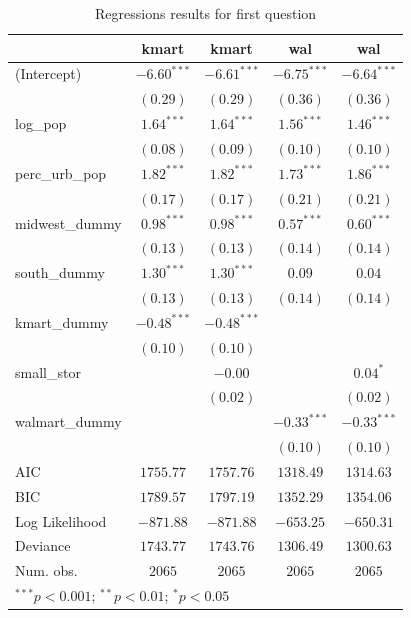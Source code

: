 \documentclass{article}
\theoremstyle{definition}
\begin{document}
\begin{table}[h]
\begin{center}
\begin{tabular}{l c c c c}
\hline
 & kmart & kmart & wal & wal \\
\hline
(Intercept)     & $-6.60^{***}$ & $-6.61^{***}$ & $-6.75^{***}$ & $-6.64^{***}$ \\
                & $(0.29)$      & $(0.29)$      & $(0.36)$      & $(0.36)$      \\
log\_pop        & $1.64^{***}$  & $1.64^{***}$  & $1.56^{***}$  & $1.46^{***}$  \\
                & $(0.08)$      & $(0.09)$      & $(0.10)$      & $(0.10)$      \\
perc\_urb\_pop  & $1.82^{***}$  & $1.82^{***}$  & $1.73^{***}$  & $1.86^{***}$  \\
                & $(0.17)$      & $(0.17)$      & $(0.21)$      & $(0.21)$      \\
midwest\_dummy  & $0.98^{***}$  & $0.98^{***}$  & $0.57^{***}$  & $0.60^{***}$  \\
                & $(0.13)$      & $(0.13)$      & $(0.14)$      & $(0.14)$      \\
south\_dummy    & $1.30^{***}$  & $1.30^{***}$  & $0.09$        & $0.04$        \\
                & $(0.13)$      & $(0.13)$      & $(0.14)$      & $(0.14)$      \\
kmart\_dummy    & $-0.48^{***}$ & $-0.48^{***}$ &               &               \\
                & $(0.10)$      & $(0.10)$      &               &               \\
small\_stor     &               & $-0.00$       &               & $0.04^{*}$    \\
                &               & $(0.02)$      &               & $(0.02)$      \\
walmart\_dummy &               &               & $-0.33^{***}$ & $-0.33^{***}$ \\
                &               &               & $(0.10)$      & $(0.10)$      \\
\hline
AIC             & $1755.77$     & $1757.76$     & $1318.49$     & $1314.63$     \\
BIC             & $1789.57$     & $1797.19$     & $1352.29$     & $1354.06$     \\
Log Likelihood  & $-871.88$     & $-871.88$     & $-653.25$     & $-650.31$     \\
Deviance        & $1743.77$     & $1743.76$     & $1306.49$     & $1300.63$     \\
Num. obs.       & $2065$        & $2065$        & $2065$        & $2065$        \\
\hline
\multicolumn{5}{l}{\scriptsize{$^{***}p<0.001$; $^{**}p<0.01$; $^{*}p<0.05$}}
\end{tabular}
\caption{Regressions results for first question}
\label{tab:1}
\end{center}
\end{table}
\end{document}
